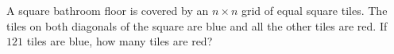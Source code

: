 A square bathroom floor is covered by an $n\times n$ grid of equal square tiles. The tiles on both diagonals of the square are blue and all the other tiles are red. If $121$ tiles are blue, how many tiles are red?
